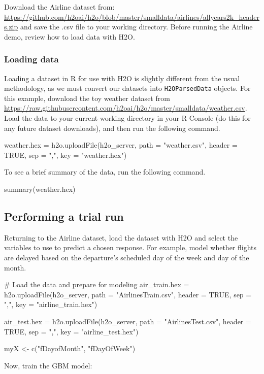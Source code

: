\documentclass[11pt]{article}
\begin{document}
{Download the Airline dataset from: {\url{https://github.com/h2oai/h2o/blob/master/smalldata/airlines/allyears2k_headers.zip}} and save the .csv file to your working directory. Before running the Airline demo, review how to load data with H2O. 

\subsubsection{Loading data}  

Loading a dataset in R for use with H2O is slightly different from the usual methodology, as we must convert our datasets into \texttt{H2OParsedData} objects. For this example, download the toy weather dataset from {\url{https://raw.githubusercontent.com/h2oai/h2o/master/smalldata/weather.csv}}.  Load the data to your current working directory in your R Console (do this for any future dataset downloads), and then run the following command.
\begin{spverbatim}
weather.hex = h2o.uploadFile(h2o_server, path = "weather.csv", header = TRUE, sep = ",", key = "weather.hex")
\end{spverbatim}
\bigskip
\noindent
To see a brief summary of the data, run the following command.
\begin{spverbatim}
summary(weather.hex)
\end{spverbatim}


\subsection{Performing a trial run}  
Returning to the Airline dataset, load the dataset with H2O and select the variables to use to predict a chosen response. For example, model whether flights are delayed based on the departure's scheduled day of the week and day of the month.
\begin{spverbatim}

# Load the data and prepare for modeling
air_train.hex = h2o.uploadFile(h2o_server, path = "AirlinesTrain.csv", header = TRUE, sep = ",", key = "airline_train.hex")

air_test.hex = h2o.uploadFile(h2o_server, path = "AirlinesTest.csv", header = TRUE, sep = ",", key = "airline_test.hex")

myX <- c("fDayofMonth", "fDayOfWeek")

\end{spverbatim}

Now, train the GBM model:

}
\end{document}
